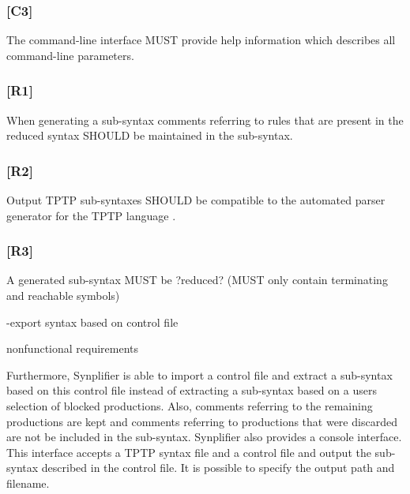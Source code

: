 \subsubsection{[C3]}\label{C3}
The command-line interface MUST provide help information which describes all command-line parameters.
\subsubsection{[R1]}\label{R1}
When generating a sub-syntax comments referring to rules that are present in the reduced syntax SHOULD be maintained in the sub-syntax.
\subsubsection{[R2]}\label{R2}
Output \ac{TPTP} sub-syntaxes SHOULD be compatible to the automated parser generator for the \ac{TPTP} language \cite{VS06}.
\subsubsection{[R3]}\label{R3}
A generated sub-syntax MUST be ?reduced? (MUST only contain terminating and reachable symbols)

-export syntax based on control file

nonfunctional requirements

Furthermore, \ac{Synplifier} is able to import a control file and extract a sub-syntax based on this control file instead of extracting a sub-syntax based on a users selection of blocked productions.
Also, comments referring to the remaining productions are kept and comments referring to productions that were discarded are not be included in the sub-syntax.
\ac{Synplifier} also provides a console interface. This interface accepts a \ac{TPTP} syntax file and a control file and output the sub-syntax described in the control file. It is possible to specify the output path and filename.

